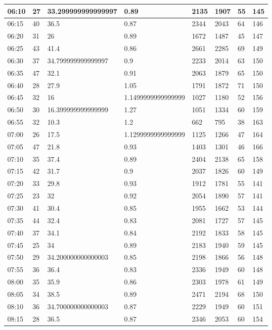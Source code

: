 \documentclass[
]{book}
\begin{document}
\begin{tabular}{l|l|l|l|l|l|l|l}
\hline
06:10 & 27 & 33.299999999999997 & 0.89 & 2135 & 1907 & 55 & 145\\
\hline
06:15 & 40 & 36.5 & 0.87 & 2344 & 2043 & 64 & 146\\
\hline
06:20 & 31 & 26 & 0.89 & 1672 & 1487 & 45 & 147\\
\hline
06:25 & 43 & 41.4 & 0.86 & 2661 & 2285 & 69 & 149\\
\hline
06:30 & 37 & 34.799999999999997 & 0.9 & 2233 & 2014 & 63 & 150\\
\hline
06:35 & 47 & 32.1 & 0.91 & 2063 & 1879 & 65 & 150\\
\hline
06:40 & 28 & 27.9 & 1.05 & 1791 & 1872 & 71 & 150\\
\hline
06:45 & 32 & 16 & 1.1499999999999999 & 1027 & 1180 & 52 & 156\\
\hline
06:50 & 30 & 16.399999999999999 & 1.27 & 1051 & 1334 & 60 & 159\\
\hline
06:55 & 32 & 10.3 & 1.2 & 662 & 795 & 38 & 163\\
\hline
07:00 & 26 & 17.5 & 1.1299999999999999 & 1125 & 1266 & 47 & 164\\
\hline
07:05 & 47 & 21.8 & 0.93 & 1403 & 1301 & 46 & 166\\
\hline
07:10 & 35 & 37.4 & 0.89 & 2404 & 2138 & 65 & 158\\
\hline
07:15 & 42 & 31.7 & 0.9 & 2037 & 1826 & 60 & 149\\
\hline
07:20 & 33 & 29.8 & 0.93 & 1912 & 1781 & 55 & 141\\
\hline
07:25 & 23 & 32 & 0.92 & 2054 & 1890 & 57 & 141\\
\hline
07:30 & 41 & 30.4 & 0.85 & 1955 & 1662 & 53 & 144\\
\hline
07:35 & 44 & 32.4 & 0.83 & 2081 & 1727 & 57 & 145\\
\hline
07:40 & 37 & 34.1 & 0.84 & 2192 & 1833 & 58 & 145\\
\hline
07:45 & 25 & 34 & 0.89 & 2183 & 1940 & 59 & 145\\
\hline
07:50 & 29 & 34.200000000000003 & 0.85 & 2198 & 1866 & 56 & 148\\
\hline
07:55 & 36 & 36.4 & 0.83 & 2336 & 1949 & 60 & 148\\
\hline
08:00 & 35 & 35.9 & 0.86 & 2303 & 1978 & 61 & 149\\
\hline
08:05 & 34 & 38.5 & 0.89 & 2471 & 2194 & 68 & 150\\
\hline
08:10 & 36 & 34.700000000000003 & 0.87 & 2229 & 1949 & 60 & 151\\
\hline
08:15 & 28 & 36.5 & 0.87 & 2346 & 2053 & 60 & 154\\

\end{tabular}
\end{document}
